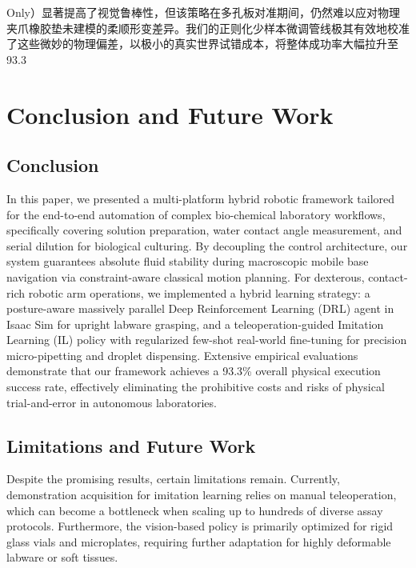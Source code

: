 \documentclass[journal,twocolumn]{IEEEtran}
\begin{document}
Only）显著提高了视觉鲁棒性，但该策略在多孔板对准期间，仍然难以应对物理夹爪橡胶垫未建模的柔顺形变差异。我们的正则化少样本微调管线极其有效地校准了这些微妙的物理偏差，以极小的真实世界试错成本，将整体成功率大幅拉升至 93.3%
\section{Conclusion and Future Work}
\label{sec:conclusion}

\subsection{Conclusion}
\label{subsec:conclusion_summary}
In this paper, we presented a multi-platform hybrid robotic framework tailored for the end-to-end automation of complex bio-chemical laboratory workflows, specifically covering solution preparation, water contact angle measurement, and serial dilution for biological culturing. By decoupling the control architecture, our system guarantees absolute fluid stability during macroscopic mobile base navigation via constraint-aware classical motion planning. For dexterous, contact-rich robotic arm operations, we implemented a hybrid learning strategy: a posture-aware massively parallel Deep Reinforcement Learning (DRL) agent in Isaac Sim for upright labware grasping, and a teleoperation-guided Imitation Learning (IL) policy with regularized few-shot real-world fine-tuning for precision micro-pipetting and droplet dispensing. Extensive empirical evaluations demonstrate that our framework achieves a 93.3\% overall physical execution success rate, effectively eliminating the prohibitive costs and risks of physical trial-and-error in autonomous laboratories.

\subsection{Limitations and Future Work}
\label{subsec:limitations_future}
Despite the promising results, certain limitations remain. Currently, demonstration acquisition for imitation learning relies on manual teleoperation, which can become a bottleneck when scaling up to hundreds of diverse assay protocols. Furthermore, the vision-based policy is primarily optimized for rigid glass vials and microplates, requiring further adaptation for highly deformable labware or soft tissues.
\end{document}
